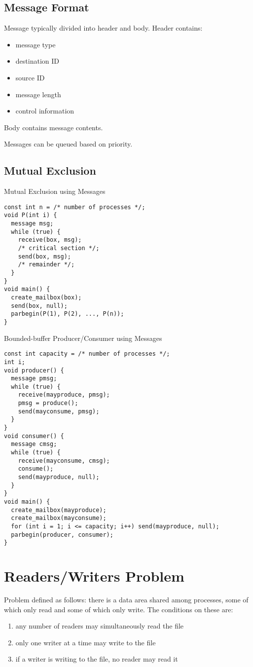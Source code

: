 \documentclass[11pt]{article}
\begin{document}
\subsection{Message Format}
\label{sec:org6e1a791}
Message typically divided into header and body.
Header contains:
\begin{itemize}
\item message type
\item destination ID
\item source ID
\item message length
\item control information
\end{itemize}

Body contains message contents.

Messages can be queued based on priority.
\subsection{Mutual Exclusion}
\label{sec:org199a74b}
Mutual Exclusion using Messages
\begin{verbatim}
const int n = /* number of processes */;
void P(int i) {
  message msg;
  while (true) {
    receive(box, msg);
    /* critical section */;
    send(box, msg);
    /* remainder */;
  }
}
void main() {
  create_mailbox(box);
  send(box, null);
  parbegin(P(1), P(2), ..., P(n));
}
\end{verbatim}

Bounded-buffer Producer/Consumer using Messages
\begin{verbatim}
const int capacity = /* number of processes */;
int i;
void producer() {
  message pmsg;
  while (true) {
    receive(mayproduce, pmsg);
    pmsg = produce();
    send(mayconsume, pmsg);
  }
}
void consumer() {
  message cmsg;
  while (true) {
    receive(mayconsume, cmsg);
    consume();
    send(mayproduce, null);
  }
}
void main() {
  create_mailbox(mayproduce);
  create_mailbox(mayconsume);
  for (int i = 1; i <= capacity; i++) send(mayproduce, null);
  parbegin(producer, consumer);
}
\end{verbatim}
\section{Readers/Writers Problem}
\label{sec:org4e4e189}
Problem defined as follows: there is a data area shared among processes,
some of which only read and some of which only write.
The conditions on these are:
\begin{enumerate}
\item any number of readers may simultaneously read the file
\item only one writer at a time may write to the file
\item if a writer is writing to the file, no reader may read it
\end{enumerate}
\end{document}
